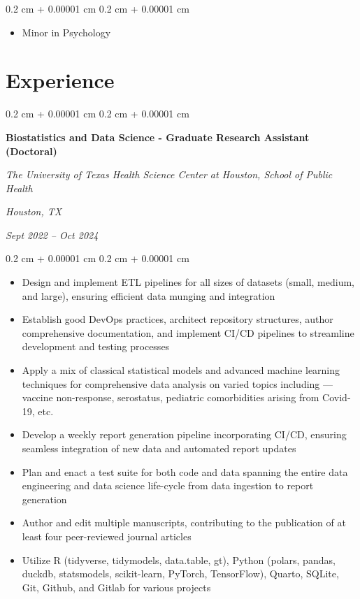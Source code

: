\documentclass[10pt, letterpaper]{article}
\newenvironment{highlights}{
    \begin{itemize}[
        topsep=0.10 cm,
        parsep=0.10 cm,
        partopsep=0pt,
        itemsep=0pt,
        leftmargin=0.4 cm + 10pt
    ]
}{
    \end{itemize}
} %
\newenvironment{onecolentry}{
    \begin{adjustwidth}{
        0.2 cm + 0.00001 cm
    }{
        0.2 cm + 0.00001 cm
    }
}{
    \end{adjustwidth}
} %
\newenvironment{twocolentry}[2][]{
    \onecolentry
    \def\secondColumn{#2}
    \setcolumnwidth{\fill, 4.5 cm}
    \begin{paracol}{2}
}{
    \switchcolumn \raggedleft \secondColumn
    \end{paracol}
    \endonecolentry
} %
\begin{document}
        \vspace{0.10 cm}
        \begin{onecolentry}
            \begin{highlights}
                \item Minor in Psychology
            \end{highlights}
        \end{onecolentry}



    
    \section{Experience}



        
        \begin{twocolentry}{
        \textit{Houston, TX}    
            
        \textit{Sept 2022 – Oct 2024}}
            \textbf{Biostatistics and Data Science - Graduate Research Assistant (Doctoral)}
            
            \textit{The University of Texas Health Science Center at Houston, School of Public Health}
        \end{twocolentry}

        \vspace{0.10 cm}
        \begin{onecolentry}
            \begin{highlights}
                \item Design and implement ETL pipelines for all sizes of datasets (small, medium, and large), ensuring efficient data munging and integration
                \item Establish good DevOps practices, architect repository structures, author comprehensive documentation, and implement CI/CD pipelines to streamline development and testing processes
                \item Apply a mix of classical statistical models and advanced machine learning techniques for comprehensive data analysis on varied topics including — vaccine non-response, serostatus, pediatric comorbidities arising from Covid-19, etc.
                \item Develop a weekly report generation pipeline incorporating CI/CD, ensuring seamless integration of new data and automated report updates
                \item Plan and enact a test suite for both code and data spanning the entire data engineering and data science life-cycle from data ingestion to report generation
                \item Author and edit multiple manuscripts, contributing to the publication of at least four peer-reviewed journal articles
                \item Utilize R (tidyverse, tidymodels, data.table, gt), Python (polars, pandas, duckdb, statsmodels, scikit-learn, PyTorch, TensorFlow), Quarto, SQLite, Git, Github, and Gitlab for various projects
            \end{highlights}
        \end{onecolentry}
\end{document}
